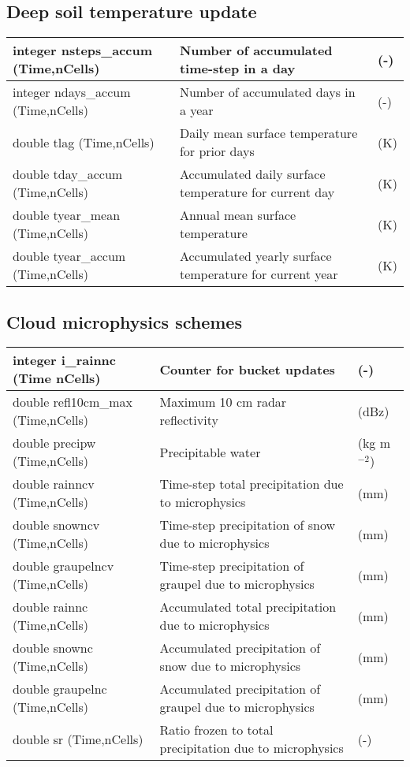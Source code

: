 \subsection{Deep soil temperature update}
{\small
\begin{longtable}{|p{2.0in} |p{3.5in} |p{0.5in} |}
\hline
        integer nsteps\_accum \hfil\break (Time,nCells) & Number of accumulated time-step in a day & (-) \\ \hline
        integer ndays\_accum \hfil\break (Time,nCells) & Number of accumulated days in a year & (-) \\ \hline
        double tlag (Time,nCells) & Daily mean surface temperature for prior days & (K) \\ \hline     
        double tday\_accum (Time,nCells) & Accumulated daily surface temperature for current day & (K) \\ \hline
        double tyear\_mean (Time,nCells) & Annual mean surface temperature  & (K) \\ \hline     
        double tyear\_accum \hfil\break (Time,nCells) & Accumulated yearly surface temperature for current year & (K) \\ \hline     
\end{longtable}
}

\subsection{Cloud microphysics schemes}

{\small
\begin{longtable}{|p{2.0in} |p{3.5in} |p{0.5in} |}
\hline
        integer i\_rainnc (Time nCells) & Counter for bucket updates & (-) \\ \hline
        double refl10cm\_max  \hfil\break (Time,nCells) & Maximum 10 cm radar reflectivity & (dBz) \\ \hline
        double precipw  (Time,nCells) & Precipitable water & (kg m$^{-2}$) \\ \hline
        double rainncv (Time,nCells) & Time-step total precipitation due to microphysics & (mm) \\ \hline
        double snowncv (Time,nCells) & Time-step precipitation of snow due to microphysics & (mm) \\ \hline
        double graupelncv (Time,nCells) & Time-step precipitation of graupel due to microphysics & (mm) \\ \hline
        double rainnc (Time,nCells) & Accumulated total precipitation due to microphysics & (mm) \\ \hline
        double snownc (Time,nCells) & Accumulated precipitation of snow due to microphysics & (mm) \\ \hline
        double graupelnc (Time,nCells) & Accumulated precipitation of graupel due to microphysics & (mm) \\ \hline
        double sr (Time,nCells) & Ratio frozen to total precipitation due to microphysics & (-) \\ \hline
\end{longtable}
}

